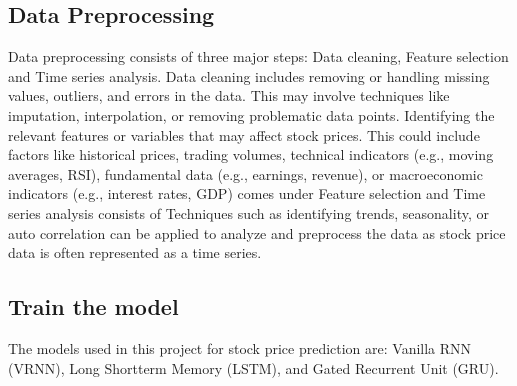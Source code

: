 \subsection{Data Preprocessing}
\vspace{-18pt}
Data preprocessing consists of three major steps: Data cleaning, Feature selection and Time series analysis. Data cleaning includes removing or handling missing values, outliers, and errors in the data. This may involve techniques like imputation, interpolation, or removing problematic data points. Identifying the relevant features or variables that may affect stock prices. This could include factors like historical prices, trading volumes, technical indicators (e.g., moving averages, RSI), fundamental data (e.g., earnings, revenue), or macroeconomic indicators (e.g., interest rates, GDP) comes under Feature selection and Time series analysis consists of Techniques such as identifying trends, seasonality, or auto correlation can be applied to analyze and preprocess the data as stock price data is often represented as a time series. 
\subsection{Train the model}
\vspace{-18pt}
The models used in this project for stock price prediction are: Vanilla RNN (VRNN), Long Shortterm Memory (LSTM), and Gated Recurrent Unit (GRU).
\par 
